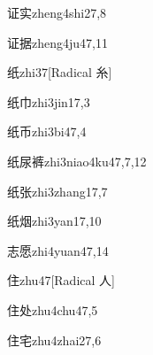 \begin{verbete}{证实}{zheng4shi2}{7,8}
\end{verbete}

\begin{verbete}{证据}{zheng4ju4}{7,11}
\end{verbete}

\begin{verbete}{纸}{zhi3}{7}[Radical 糸]
\end{verbete}

\begin{verbete}{纸巾}{zhi3jin1}{7,3}
\end{verbete}

\begin{verbete}{纸币}{zhi3bi4}{7,4}
\end{verbete}

\begin{verbete}{纸尿裤}{zhi3niao4ku4}{7,7,12}
\end{verbete}

\begin{verbete}{纸张}{zhi3zhang1}{7,7}
\end{verbete}

\begin{verbete}{纸烟}{zhi3yan1}{7,10}
\end{verbete}

\begin{verbete}{志愿}{zhi4yuan4}{7,14}
\end{verbete}

\begin{verbete}{住}{zhu4}{7}[Radical 人]
\end{verbete}

\begin{verbete}{住处}{zhu4chu4}{7,5}
\end{verbete}

\begin{verbete}{住宅}{zhu4zhai2}{7,6}
\end{verbete}

